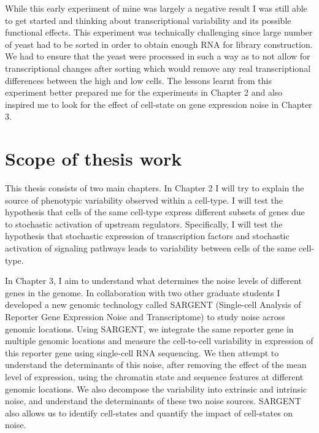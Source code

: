 While this early experiment of mine was largely a negative result I was still able to get started and thinking about transcriptional variability and its possible functional effects. This experiment was technically challenging since large number of yeast had to be sorted in order to obtain enough RNA for library construction. We had to ensure that the yeast were processed in such a way as to not allow for transcriptional changes after sorting which would remove any real transcriptional differences between the high and low cells. The lessons learnt from this experiment better prepared me for the experiments in Chapter 2 and also inspired me to look for the effect of cell-state on gene expression noise in Chapter 3.

\section{Scope of thesis work}

This thesis consists of two main chapters. In  Chapter 2 I will try to explain the source of phenotypic variability observed within a cell-type. I will test the hypothesis that cells of the same cell-type express different subsets of genes due to stochastic activation of upstream regulators. Specifically, I will test the hypothesis that stochastic expression of transcription factors and stochastic activation of signaling pathways leads to variability between cells of the same cell-type.

In Chapter 3, I aim to understand what determines the noise levels of different genes in the genome. In collaboration with two other graduate students I developed a new genomic technology called SARGENT (Single-cell Analysis of Reporter Gene Expression Noise and Transcriptome) to study noise across genomic locations. Using SARGENT, we integrate the same reporter gene in multiple genomic locations and measure the cell-to-cell variability in expression of this reporter gene using single-cell RNA sequencing. We then attempt to understand the determinants of this noise, after removing the effect of the mean level of expression, using the chromatin state and sequence features at different genomic locations. We also decompose the variability into extrinsic and intrinsic noise, and understand the determinants of these two noise sources. SARGENT also allows us to identify cell-states and quantify the impact of cell-states on noise.
